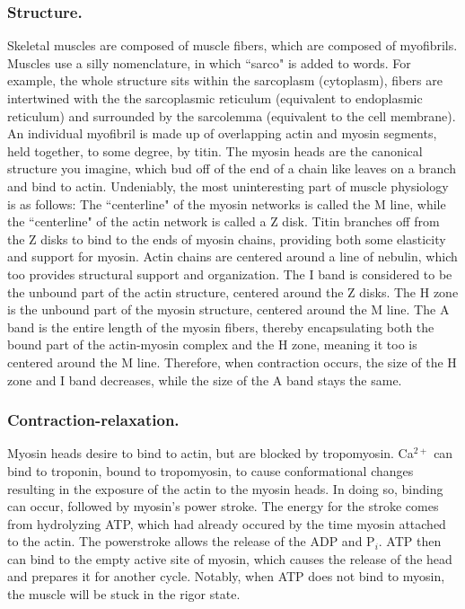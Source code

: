 \documentclass[12pt]{report}
\begin{document}
\subsubsection{Structure.}
Skeletal muscles are composed of muscle fibers, which are composed of myofibrils. Muscles use a silly nomenclature, in which ``sarco" is added to words. For example, the whole structure sits within the sarcoplasm (cytoplasm), fibers are intertwined with the the sarcoplasmic reticulum (equivalent to endoplasmic reticulum) and surrounded by the sarcolemma (equivalent to the cell membrane). An individual myofibril is made up of overlapping actin and myosin segments, held together, to some degree, by titin. The myosin heads are the canonical structure you imagine, which bud off of the end of a chain like leaves on a branch and bind to actin. Undeniably, the most uninteresting part of muscle physiology is as follows: The ``centerline" of the myosin networks is called the M line, while the ``centerline" of the actin network is called a Z disk. Titin branches off from the Z disks to bind to the ends of myosin chains, providing both some elasticity and support for myosin. Actin chains are centered around a line of nebulin, which too provides structural support and organization. The I band is considered to be the unbound part of the actin structure, centered around the Z disks. The H zone is the unbound part of the myosin structure, centered around the M line. The A band is the entire length of the myosin fibers, thereby encapsulating both the bound part of the actin-myosin complex and the H zone, meaning it too is centered around the M line. Therefore, when contraction occurs, the size of the H zone and I band decreases, while the size of the A band stays the same.

\subsubsection{Contraction-relaxation.}
Myosin heads desire to bind to actin, but are blocked by tropomyosin. Ca$^{2+}$ can bind to troponin, bound to tropomyosin, to cause conformational changes resulting in the exposure of the actin to the myosin heads. In doing so, binding can occur, followed by myosin's power stroke. The energy for the stroke comes from hydrolyzing ATP, which had already occured by the time myosin attached to the actin. The powerstroke allows the release of the ADP and P$_i$. ATP then can bind to the empty active site of myosin, which causes the release of the head and prepares it for another cycle. Notably, when ATP does not bind to myosin, the muscle will be stuck in the rigor state.\newline
\end{document}
